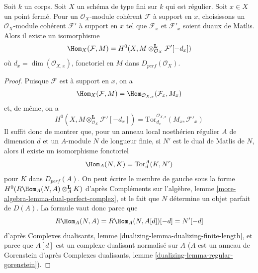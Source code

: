 \begin{lemma}
\label{lemma-duality-at-point}
Soit $k$ un corps. Soit $X$ un schéma de type fini sur $k$ qui
est régulier. Soit $x \in X$ un point fermé. Pour un
$\mathcal{O}_X$-module cohérent $\mathcal{F}$ à support en $x$, choisissons
un $\mathcal{O}_X$-module cohérent $\mathcal{F}'$ à support en $x$
tel que $\mathcal{F}_x$ et $\mathcal{F}'_x$ soient duaux de Matlis.
Alors il existe un isomorphisme
$$
\Hom_X(\mathcal{F}, M) =
H^0(X, M \otimes_{\mathcal{O}_X}^\mathbf{L} \mathcal{F}'[-d_x])
$$
où $d_x = \dim(\mathcal{O}_{X, x})$,
fonctoriel en $M$ dans $D_{perf}(\mathcal{O}_X)$.
\end{lemma}

\begin{proof}
Puisque $\mathcal{F}$ est à support en $x$, on a
$$
\Hom_X(\mathcal{F}, M) =
\Hom_{\mathcal{O}_{X, x}}(\mathcal{F}_x, M_x)
$$
et, de même, on a
$$
H^0(X, M \otimes_{\mathcal{O}_X}^\mathbf{L} \mathcal{F}'[-d_x]) =
\text{Tor}^{\mathcal{O}_{X, x}}_{d_x}(M_x, \mathcal{F}'_x)
$$
Il suffit donc de montrer que, pour un anneau local noethérien régulier $A$
de dimension $d$ et un $A$-module $N$ de longueur finie, si
$N'$ est le dual de Matlis de $N$, alors il existe un isomorphisme fonctoriel
$$
\Hom_A(N, K) = \text{Tor}^A_d(K, N')
$$
pour $K$ dans $D_{perf}(A)$. On peut écrire le membre de gauche sous la forme
$H^0(R\Hom_A(N, A) \otimes_A^\mathbf{L} K)$ d'après
Compléments sur l'algèbre, lemme \ref{more-algebra-lemma-dual-perfect-complex},
et le fait que $N$ détermine un objet parfait de $D(A)$.
La formule vaut donc parce que
$$
R\Hom_A(N, A) = R\Hom_A(N, A[d])[-d] = N'[-d]
$$
d'après Complexes dualisants, lemme \ref{dualizing-lemma-dualizing-finite-length},
et parce que $A[d]$ est un complexe dualisant normalisé sur $A$
($A$ est un anneau de Gorenstein d'après
Complexes dualisants, lemme \ref{dualizing-lemma-regular-gorenstein}).
\end{proof}

